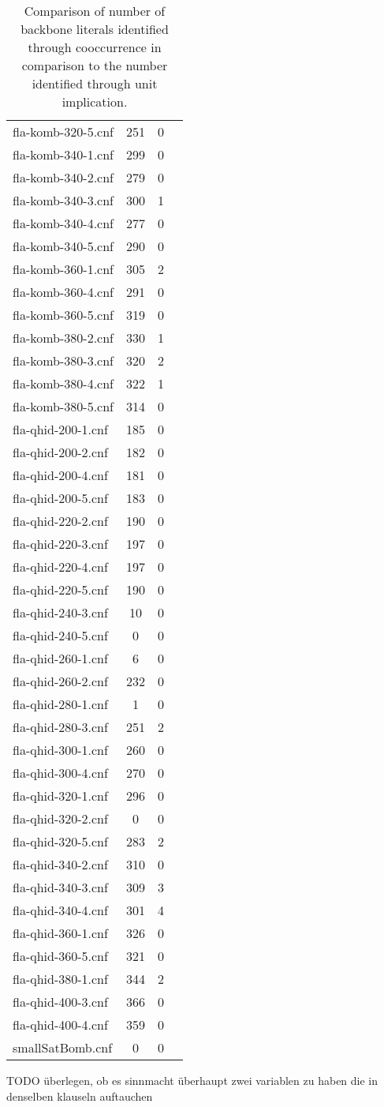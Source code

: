 \begin{wraptable}{L}{7cm}
\begin{tabular}{l| c c c }
fla-komb-320-5.cnf & 251 & 0 \\
fla-komb-340-1.cnf & 299 & 0 \\
fla-komb-340-2.cnf & 279 & 0 \\
fla-komb-340-3.cnf & 300 & 1 \\
fla-komb-340-4.cnf & 277 & 0 \\
fla-komb-340-5.cnf & 290 & 0 \\
fla-komb-360-1.cnf & 305 & 2 \\
fla-komb-360-4.cnf & 291 & 0 \\
fla-komb-360-5.cnf & 319 & 0 \\
fla-komb-380-2.cnf & 330 & 1 \\
fla-komb-380-3.cnf & 320 & 2 \\
fla-komb-380-4.cnf & 322 & 1 \\
fla-komb-380-5.cnf & 314 & 0 \\
fla-qhid-200-1.cnf & 185 & 0 \\
fla-qhid-200-2.cnf & 182 & 0 \\
fla-qhid-200-4.cnf & 181 & 0 \\
fla-qhid-200-5.cnf & 183 & 0 \\
fla-qhid-220-2.cnf & 190 & 0 \\
fla-qhid-220-3.cnf & 197 & 0 \\
fla-qhid-220-4.cnf & 197 & 0 \\
fla-qhid-220-5.cnf & 190 & 0 \\
fla-qhid-240-3.cnf & 10 & 0 \\
fla-qhid-240-5.cnf & 0 & 0 \\
fla-qhid-260-1.cnf & 6 & 0 \\
fla-qhid-260-2.cnf & 232 & 0 \\
fla-qhid-280-1.cnf & 1 & 0 \\
fla-qhid-280-3.cnf & 251 & 2 \\
fla-qhid-300-1.cnf & 260 & 0 \\
fla-qhid-300-4.cnf & 270 & 0 \\
fla-qhid-320-1.cnf & 296 & 0 \\
\fi
fla-qhid-320-2.cnf & 0 & 0 \\
fla-qhid-320-5.cnf & 283 & 2 \\
fla-qhid-340-2.cnf & 310 & 0 \\
fla-qhid-340-3.cnf & 309 & 3 \\
fla-qhid-340-4.cnf & 301 & 4 \\
fla-qhid-360-1.cnf & 326 & 0 \\
fla-qhid-360-5.cnf & 321 & 0 \\
fla-qhid-380-1.cnf & 344 & 2 \\
fla-qhid-400-3.cnf & 366 & 0 \\
fla-qhid-400-4.cnf & 359 & 0 \\
smallSatBomb.cnf & 0 & 0\\
\end{tabular}
\caption{Comparison of number of backbone literals identified through cooccurrence in comparison to the number identified through unit implication.}
\end{wraptable}


TODO überlegen, ob es sinnmacht überhaupt zwei variablen zu haben die in denselben klauseln auftauchen
